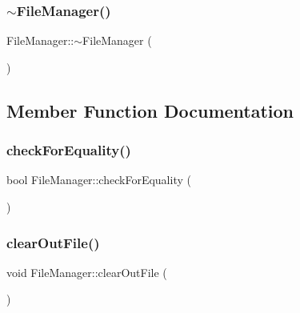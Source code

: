 \hypertarget{class_file_manager_abaed33b5b0c13b8a597db9335a1aacfa}{}\label{class_file_manager_abaed33b5b0c13b8a597db9335a1aacfa} 
\subsubsection{\texorpdfstring{$\sim$\+File\+Manager()}{~FileManager()}}
{\footnotesize\ttfamily File\+Manager\+::$\sim$\+File\+Manager (\begin{DoxyParamCaption}{ }\end{DoxyParamCaption})}



\subsection{Member Function Documentation}
\hypertarget{class_file_manager_ab490a5a5882d33781dcb6d1d42945d97}{}\label{class_file_manager_ab490a5a5882d33781dcb6d1d42945d97} 
\subsubsection{\texorpdfstring{check\+For\+Equality()}{checkForEquality()}}
{\footnotesize\ttfamily bool File\+Manager\+::check\+For\+Equality (\begin{DoxyParamCaption}{ }\end{DoxyParamCaption})}

\hypertarget{class_file_manager_a2f1102abfd0a5a9d7e178968a3fdc56c}{}\label{class_file_manager_a2f1102abfd0a5a9d7e178968a3fdc56c} 
\subsubsection{\texorpdfstring{clear\+Out\+File()}{clearOutFile()}}
{\footnotesize\ttfamily void File\+Manager\+::clear\+Out\+File (\begin{DoxyParamCaption}{ }\end{DoxyParamCaption})}

\hypertarget{class_file_manager_a4a4719a410ca31985e8b75ad75485ce6}{}\label{class_file_manager_a4a4719a410ca31985e8b75ad75485ce6} 
